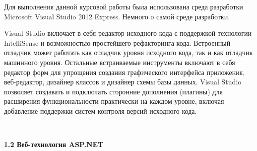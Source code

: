 \documentclass[14pt,a4paper]{extreport}
\begin{document}
Для выполнения данной курсовой работы была использована среда разработки Microsoft Visual Studio 2012 Express. 
	Немного о самой среде разработки.\par
	Visual Studio включает в себя редактор исходного кода с поддержкой технологии IntelliSense и возможностью простейшего рефакторинга кода. Встроенный отладчик может работать как отладчик уровня исходного кода, так и как отладчик машинного уровня. Остальные встраиваемые инструменты включают в себя редактор форм для упрощения создания графического интерфейса приложения, веб-редактор, дизайнер классов и дизайнер схемы базы данных. Visual Studio позволяет создавать и подключать сторонние дополнения (плагины) для расширения функциональности практически на каждом уровне, включая добавление поддержки систем контроля версий исходного кода.\par
	~\\

	\textbf{1.2 Веб-технология ASP.NET}
\end{document}
